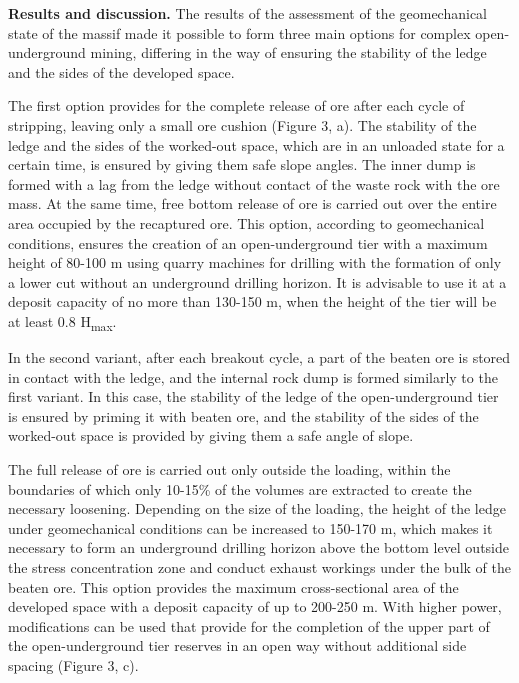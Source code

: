 \begin{multicols}{2}
{\bfseries Results and discussion.} The results of the assessment of the
geomechanical state of the massif made it possible to form three main
options for complex open-underground mining, differing in the way of
ensuring the stability of the ledge and the sides of the developed
space.

The first option provides for the complete release of ore after each
cycle of stripping, leaving only a small ore cushion (Figure 3, a). The
stability of the ledge and the sides of the worked-out space, which are
in an unloaded state for a certain time, is ensured by giving them safe
slope angles. The inner dump is formed with a lag from the ledge without
contact of the waste rock with the ore mass. At the same time, free
bottom release of ore is carried out over the entire area occupied by
the recaptured ore. This option, according to geomechanical conditions,
ensures the creation of an open-underground tier with a maximum height
of 80-100 m using quarry machines for drilling with the formation of
only a lower cut without an underground drilling horizon. It is
advisable to use it at a deposit capacity of no more than 130-150 m,
when the height of the tier will be at least 0.8 H\textsubscript{max}.

In the second variant, after each breakout cycle, a part of the beaten
ore is stored in contact with the ledge, and the internal rock dump is
formed similarly to the first variant. In this case, the stability of
the ledge of the open-underground tier is ensured by priming it with
beaten ore, and the stability of the sides of the worked-out space is
provided by giving them a safe angle of slope.

The full release of ore is carried out only outside the loading, within
the boundaries of which only 10-15\% of the volumes are extracted to
create the necessary loosening. Depending on the size of the loading,
the height of the ledge under geomechanical conditions can be increased
to 150-170 m, which makes it necessary to form an underground drilling
horizon above the bottom level outside the stress concentration zone and
conduct exhaust workings under the bulk of the beaten ore. This option
provides the maximum cross-sectional area of the developed space with a
deposit capacity of up to 200-250 m. With higher power, modifications
can be used that provide for the completion of the upper part of the
open-underground tier reserves in an open way without additional side
spacing (Figure 3, c).
\end{multicols}

